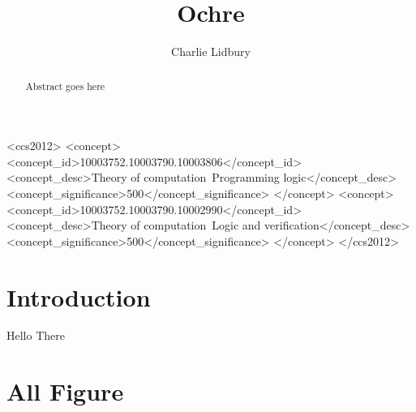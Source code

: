 \documentclass[acmsmall,screen]{acmart}
\begin{document}
\title{Ochre}

\author{Charlie Lidbury}


\begin{abstract}
  Abstract goes here
\end{abstract}


\begin{CCSXML}
<ccs2012>
<concept>
<concept_id>10003752.10003790.10003806</concept_id>
<concept_desc>Theory of computation~Programming logic</concept_desc>
<concept_significance>500</concept_significance>
</concept>
<concept>
<concept_id>10003752.10003790.10002990</concept_id>
<concept_desc>Theory of computation~Logic and verification</concept_desc>
<concept_significance>500</concept_significance>
</concept>
</ccs2012>
\end{CCSXML}




\maketitle

\section{Introduction}
Hello There

\section{All Figure}
\end{document}

